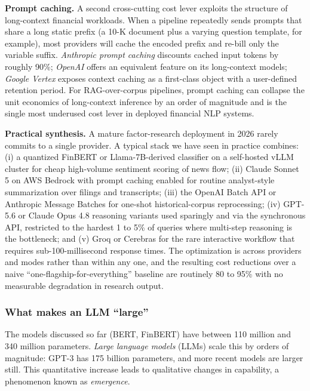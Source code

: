 \textbf{Prompt caching.} A second cross-cutting cost lever exploits the structure of long-context financial workloads. When a pipeline repeatedly sends prompts that share a long static prefix (a 10-K document plus a varying question template, for example), most providers will cache the encoded prefix and re-bill only the variable suffix. \textit{Anthropic prompt caching} discounts cached input tokens by roughly 90\%; \textit{OpenAI} offers an equivalent feature on its long-context models; \textit{Google Vertex} exposes context caching as a first-class object with a user-defined retention period. For RAG-over-corpus pipelines, prompt caching can collapse the unit economics of long-context inference by an order of magnitude and is the single most underused cost lever in deployed financial NLP systems.

\textbf{Practical synthesis.} A mature factor-research deployment in 2026 rarely commits to a single provider. A typical stack we have seen in practice combines: (i) a quantized FinBERT or Llama-7B-derived classifier on a self-hosted vLLM cluster for cheap high-volume sentiment scoring of news flow; (ii) Claude Sonnet 5 on AWS Bedrock with prompt caching enabled for routine analyst-style summarization over filings and transcripts; (iii) the OpenAI Batch API or Anthropic Message Batches for one-shot historical-corpus reprocessing; (iv) GPT-5.6 or Claude Opus 4.8 reasoning variants used sparingly and via the synchronous API, restricted to the hardest 1 to 5\% of queries where multi-step reasoning is the bottleneck; and (v) Groq or Cerebras for the rare interactive workflow that requires sub-100-millisecond response times. The optimization is across providers and modes rather than within any one, and the resulting cost reductions over a naive ``one-flagship-for-everything'' baseline are routinely 80 to 95\% with no measurable degradation in research output.

\subsubsection{What makes an LLM ``large''}

The models discussed so far (BERT, FinBERT) have between 110 million and 340 million parameters. \textit{Large language models} (LLMs) scale this by orders of magnitude: GPT-3 \citep{brown2020language} has 175 billion parameters, and more recent models are larger still. This quantitative increase leads to qualitative changes in capability, a phenomenon known as \textit{emergence}.


